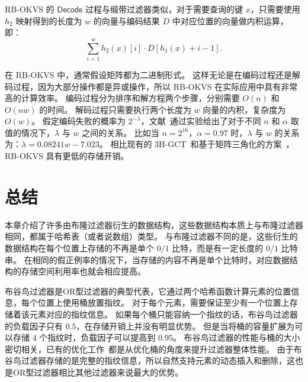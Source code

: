 RB-OKVS 的 $\mathsf{Decode}$ 过程与缎带过滤器类似，对于需要查询的键 $x$，只需要使用 $h_2$ 映射得到的长度为 $w$ 的向量与编码结果 $D$ 中对应位置的向量做内积运算，即：
\begin{equation}
  \sum_{i=1}^{w} h_2(x)[i] \cdot D[h_1(x) + i -1].
\end{equation}

在 RB-OKVS 中，通常假设矩阵都为二进制形式。
这样无论是在编码过程还是解码过程，因为大部分操作都是异或操作，所以 RB-OKVS 在实际应用中具有非常高的计算效率。
编码过程分为排序和解方程两个步骤，分别需要 $O(n)$ 和 $O(nw)$ 的时间。
解码过程只需要执行两个长度为 $w$ 向量的内积，复杂度为 $O(w)$。
假定编码失败的概率为 $2^{-\lambda}$，文献~\cite{botelho2013Practical}通过实验给出了对于不同 $n$ 和 $\alpha$ 取值的情况下，$\lambda$ 与 $w$ 之间的关系。
比如当 $n=2^{16}$，$\alpha=0.97$ 时，$\lambda$ 与 $w$ 的关系为：$\lambda = 0.08241 w - 7.023$。
相比现有的 3H-GCT~\cite{garimella2021oblivious}和基于矩阵三角化的方案~\cite{raghuraman2022blazing}，RB-OKVS 具有更低的存储开销。


\section{总结}\label{}

本章介绍了许多由布隆过滤器衍生的数据结构，这些数据结构本质上与布隆过滤器相同，都属于哈希表（或者说数组）类型。
与布隆过滤器不同的是，这些衍生的数据结构在每个位置上存储的不再是单个 $0/1$ 比特，而是有一定长度的 $0/1$ 比特串。
在相同的假正例率的情况下，当存储的内容不再是单个比特时，对应数据结构的存储空间利用率也就会相应提高。

布谷鸟过滤器是OR型过滤器的典型代表，它通过两个哈希函数计算元素的位置信息，每个位置上使用桶放置指纹。
对于每个元素，需要保证至少有一个位置上存储着该元素对应的指纹信息。
如果每个桶只能容纳一个指纹的话，布谷鸟过滤器的负载因子只有 $0.5$，在存储开销上并没有明显优势。
但是当将桶的容量扩展为可以存储 $4$ 个指纹时，负载因子可以提高到 $0.95$。
布谷鸟过滤器的性能与桶的大小密切相关，已有的优化工作~\cite{breslow2020morton,wang2019vacuum}都是从优化桶的角度来提升过滤器整体性能。
由于布谷鸟过滤器存储的是完整的指纹信息，所以自然支持元素的动态插入和删除，这也是OR型过滤器相比其他过滤器来说最大的优势。

